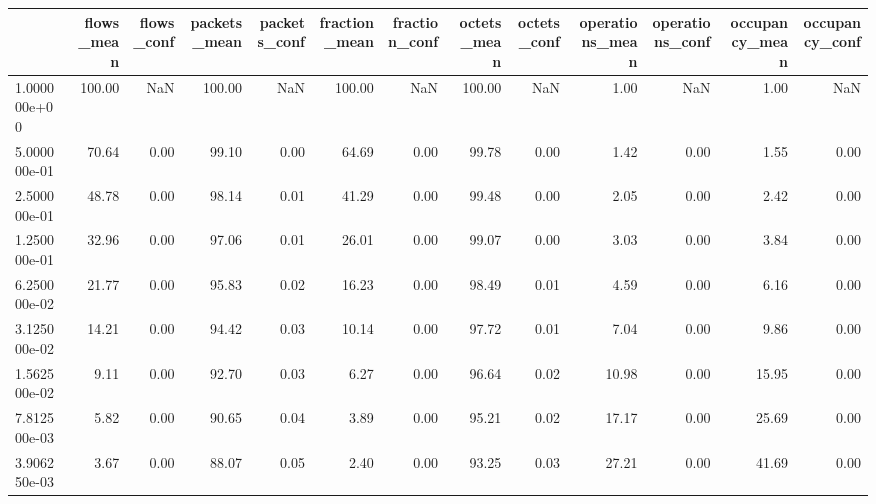 \begin{tabular}{lrrrrrrrrrrrr}
\toprule
{} &  flows\_mean &  flows\_conf &  packets\_mean &  packets\_conf &  fraction\_mean &  fraction\_conf &  octets\_mean &  octets\_conf &  operations\_mean &  operations\_conf &  occupancy\_mean &  occupancy\_conf \\
\midrule
1.000000e+00 &      100.00 &         NaN &        100.00 &           NaN &         100.00 &            NaN &       100.00 &          NaN &             1.00 &              NaN &            1.00 &             NaN \\
5.000000e-01 &       70.64 &        0.00 &         99.10 &          0.00 &          64.69 &           0.00 &        99.78 &         0.00 &             1.42 &             0.00 &            1.55 &            0.00 \\
2.500000e-01 &       48.78 &        0.00 &         98.14 &          0.01 &          41.29 &           0.00 &        99.48 &         0.00 &             2.05 &             0.00 &            2.42 &            0.00 \\
1.250000e-01 &       32.96 &        0.00 &         97.06 &          0.01 &          26.01 &           0.00 &        99.07 &         0.00 &             3.03 &             0.00 &            3.84 &            0.00 \\
6.250000e-02 &       21.77 &        0.00 &         95.83 &          0.02 &          16.23 &           0.00 &        98.49 &         0.01 &             4.59 &             0.00 &            6.16 &            0.00 \\
3.125000e-02 &       14.21 &        0.00 &         94.42 &          0.03 &          10.14 &           0.00 &        97.72 &         0.01 &             7.04 &             0.00 &            9.86 &            0.00 \\
1.562500e-02 &        9.11 &        0.00 &         92.70 &          0.03 &           6.27 &           0.00 &        96.64 &         0.02 &            10.98 &             0.00 &           15.95 &            0.00 \\
7.812500e-03 &        5.82 &        0.00 &         90.65 &          0.04 &           3.89 &           0.00 &        95.21 &         0.02 &            17.17 &             0.00 &           25.69 &            0.00 \\
3.906250e-03 &        3.67 &        0.00 &         88.07 &          0.05 &           2.40 &           0.00 &        93.25 &         0.03 &            27.21 &             0.00 &           41.69 &            0.00 \\

\end{tabular}

